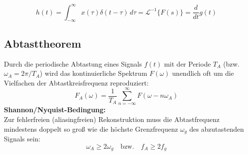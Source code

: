 \begin{tcolorbox}
\[
h(t) = \int_{-\infty}^\infty x(\tau) \delta(t - \tau) \, d\tau = \mathcal{L}^{-1}\{F(s)\} = \frac{d}{dt} g(t)
\]
\end{tcolorbox}

\subsection{Abtasttheorem}
\begin{tcolorbox}
Durch die periodische Abtastung eines Signals $f(t)$ mit der Periode $T_A$ (bzw. $\omega_A = 2\pi/T_A$) wird das kontinuierliche Spektrum $F(\omega)$ unendlich oft um die Vielfachen der Abtastkreisfrequenz reproduziert:
\[
F_A(\omega) = \frac{1}{T_A} \sum_{n=-\infty}^\infty F(\omega - n \omega_A)
\]
\textbf{Shannon/Nyquist-Bedingung:}\\[2pt]
Zur fehlerfreien (aliasingfreien) Rekonstruktion muss die Abtastfrequenz mindestens doppelt so groß wie die höchste Grenzfrequenz $\omega_g$ des abzutastenden Signals sein:
\[
\omega_A \ge 2 \omega_g \quad \text{bzw.} \quad f_A \ge 2 f_g
\]
\end{tcolorbox}
